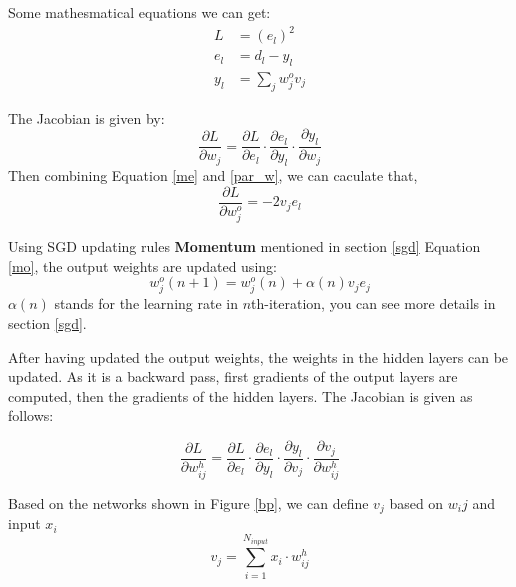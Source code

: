     Some mathesmatical equations we can get:
    \begin{equation}
        \begin{aligned}
            L &= (e_l)^2 \\
            e_l &= d_l -y_l \\
            y_l &= \sum_{j}w^{o}_j v_j 
        \end{aligned}
        \label{me}
    \end{equation}

    The Jacobian is given by:
    \begin{equation}
        \frac{\partial L}{\partial w_{j}} = \frac{\partial L}{\partial e_l} \cdot \frac{\partial e_l}{\partial y_l} \cdot \frac{\partial y_l}{\partial w_{j}}
        \label{par_w}
    \end{equation}
    Then combining Equation \ref{me} and \ref{par_w}, we can caculate that,
    \begin{equation}
        \frac{\partial L}{\partial w^{o}_{j}} = -2v_j e_l
    \end{equation}

    Using SGD updating rules \textbf{Momentum} mentioned in section \ref{sgd} Equation \ref{mo}, the output weights are updated using:
    \begin{equation}
        w^{o}_{j}(n+1) = w^{o}_{j}(n) + \alpha(n)v_j e_j
    \end{equation}
    $\alpha(n)$ stands for the learning rate in $n$th-iteration, you can see more details in section \ref{sgd}.

    After having updated the output weights, the weights in the hidden layers can be updated. As it is a backward pass, first gradients of the output layers are computed, then the gradients of the hidden layers. The Jacobian is given as follows:

    \begin{equation}
        \frac{\partial L}{\partial w^{h}_{ij}} = \frac{\partial L}{\partial e_l} \cdot \frac{\partial e_l}{\partial y_l} \cdot \frac{\partial y_l}{\partial v_{j}} \cdot \frac{\partial v_j}{\partial w^{h}_{ij}}
        \label{par_w}
    \end{equation}

    Based on the networks shown in Figure \ref{bp}, we can define $v_j$ based on $w_ij$ and input $x_i$
    \begin{equation}
        v_j = \sum_{i=1}^{N_{input}}x_i\cdot w^{h}_{ij}
        \label{vj}
    \end{equation}


